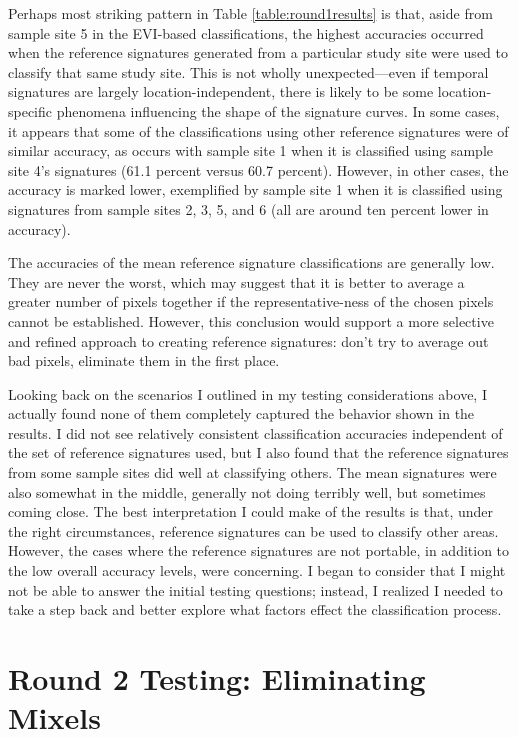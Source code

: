 Perhaps most striking pattern in Table \ref{table:round1results} is that, aside from sample site 5 in the EVI-based classifications, the highest accuracies occurred when the reference signatures generated from a particular study site were used to classify that same study site. This is not wholly unexpected—even if temporal signatures are largely location-independent, there is likely to be some location-specific phenomena influencing the shape of the signature curves. In some cases, it appears that some of the classifications using other reference signatures were of similar accuracy, as occurs with sample site 1 when it is classified using sample site 4’s signatures (61.1 percent versus 60.7 percent). However, in other cases, the accuracy is marked lower, exemplified by sample site 1 when it is classified using signatures from sample sites 2, 3, 5, and 6 (all are around ten percent lower in accuracy).

The accuracies of the mean reference signature classifications are generally low. They are never the worst, which may suggest that it is better to average a greater number of pixels together if the representative-ness of the chosen pixels cannot be established. However, this conclusion would support a more selective and refined approach to creating reference signatures: don’t try to average out bad pixels, eliminate them in the first place.

Looking back on the scenarios I outlined in my testing considerations above, I actually found none of them completely captured the behavior shown in the results. I did not see relatively consistent classification accuracies independent of the set of reference signatures used, but I also found that the reference signatures from some sample sites did well at classifying others. The mean signatures were also somewhat in the middle, generally not doing terribly well, but sometimes coming close. The best interpretation I could make of the results is that, under the right circumstances, reference signatures can be used to classify other areas. However, the cases where the reference signatures are not portable, in addition to the low overall accuracy levels, were concerning. I began to consider that I might not be able to answer the initial testing questions; instead, I realized I needed to take a step back and better explore what factors effect the classification process.

\section{Round 2 Testing: Eliminating Mixels}
\label{appendix:testing:r2}

